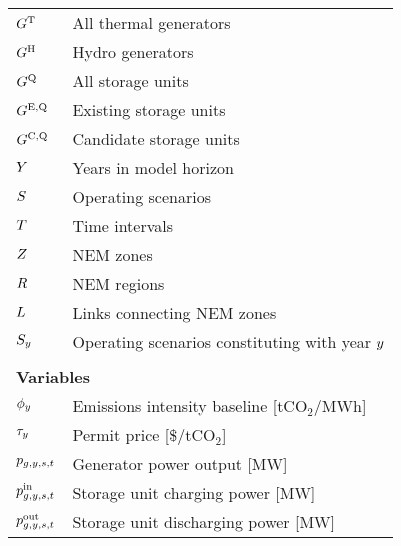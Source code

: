 \documentclass{article}
\begin{document}
\begin{longtable}{ p{}  p{}}
		$G^{\mathrm{T}}$ & All thermal generators\\
		$G^{\mathrm{H}}$ & Hydro generators\\
		$G^{\mathrm{Q}}$ & All storage units\\
		$G^{\mathrm{E,Q}}$ & Existing storage units\\
		$G^{\mathrm{C,Q}}$ & Candidate storage units\\
		$Y$ & Years in model horizon\\
		$S$ & Operating scenarios\\
		$T$ & Time intervals\\
		$Z$ & NEM zones\\
		$R$ & NEM regions\\
		$L$ & Links connecting NEM zones\\
		$S_{y}$ & Operating scenarios constituting with year $y$\\
		& \\
		\multicolumn{2}{l}{\textbf{Variables}}\\
		$\phi_{y}$ & Emissions intensity baseline [tCO$_{2}$/MWh]\\
		$\tau_{y}$ & Permit price [\$/tCO$_{2}$]\\
		$p_{g,y,s,t}$ & Generator power output [MW]\\
		$p^{\mathrm{in}}_{g,y,s,t}$ & Storage unit charging power [MW]\\
		$p^{\mathrm{out}}_{g,y,s,t}$ & Storage unit discharging power [MW]\\

\end{longtable}
\end{document}
